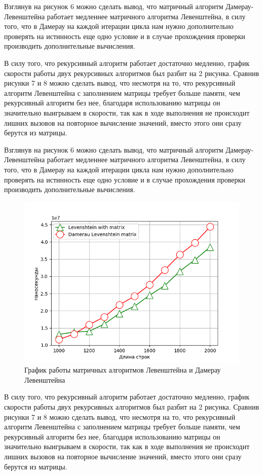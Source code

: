 \documentclass[12pt,a4paper,oneside]{report}
\begin{document}
\qquad Взглянув на рисунок 6 можно сделать вывод, что матричный алгоритм Дамерау-Левенштейна работает медленнее матричного алгоритма Левенштейна, в силу того, что в Дамерау на каждой итерации цикла нам нужно дополнительно проверять на истинность еще одно условие и в случае прохождения проверки производить дополнительные вычисления.



\qquad В силу того, что рекурсивный алгоритм работает достаточно медленно, график скорости работы двух рекурсивных алгоритмов был разбит на 2 рисунка. Сравнив рисунки 7 и 8 можно сделать вывод, что несмотря на то, что рекурсивный алгоритм Левенштейна с заполнением матрицы требует больше памяти, чем рекурсивный алгоритм без нее, благодаря использованию матрицы он значительно выигрываем в скорости, так как в ходе выполнения не происходит лишних вызовов на повторное вычисление значений, вместо этого они сразу берутся из матрицы.

\qquad Взглянув на рисунок 6 можно сделать вывод, что матричный алгоритм Дамерау-Левенштейна работает медленнее матричного алгоритма Левенштейна, в силу того, что в Дамерау на каждой итерации цикла нам нужно дополнительно проверять на истинность еще одно условие и в случае прохождения проверки производить дополнительные вычисления.

\begin{figure}[h!]
	\centering
	\includegraphics[width=0.54\linewidth]{matrix.png}
	\caption{График работы матричных алгоритмов Левенштейна и Дамерау Левенштейна }
\end{figure}

\qquad В силу того, что рекурсивный алгоритм работает достаточно медленно, график скорости работы двух рекурсивных алгоритмов был разбит на 2 рисунка. Сравнив рисунки 7 и 8 можно сделать вывод, что несмотря на то, что рекурсивный алгоритм Левенштейна с заполнением матрицы требует больше памяти, чем рекурсивный алгоритм без нее, благодаря использованию матрицы он значительно выигрываем в скорости, так как в ходе выполнения не происходит лишних вызовов на повторное вычисление значений, вместо этого они сразу берутся из матрицы.
\end{document}
